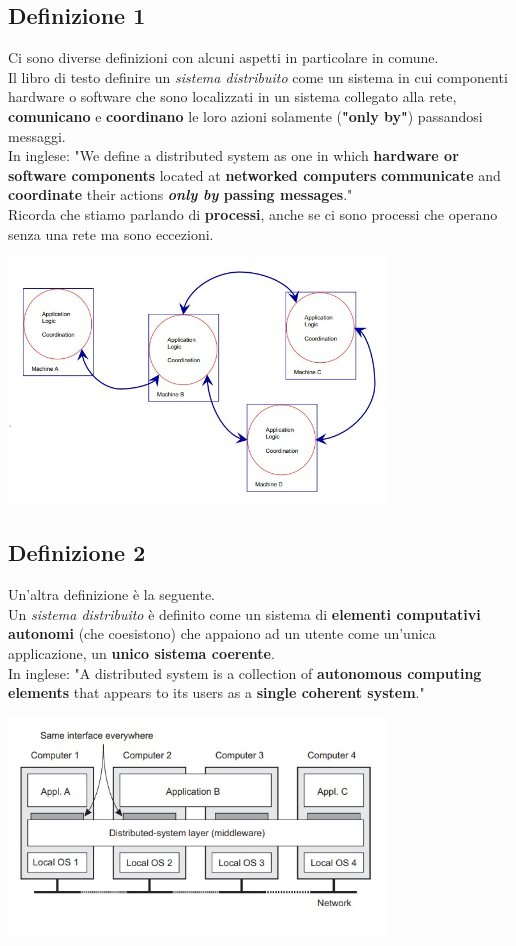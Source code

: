 \subsection{Definizione 1}
Ci sono diverse definizioni con alcuni aspetti in particolare in comune.
\\Il libro di testo definire un \textit{sistema distribuito} come un sistema in cui componenti hardware o software che sono localizzati in un sistema collegato alla rete, \textbf{comunicano} e \textbf{coordinano} le loro azioni solamente (\textbf{"only by"}) passandosi messaggi.
\\In inglese: "We define a distributed system as one in which \textbf{hardware or software components} located at \textbf{networked computers} \textbf{communicate} and \textbf{coordinate} their actions \textbf{\textit{only by} passing messages}."
\\Ricorda che stiamo parlando di \textbf{processi}, anche se ci sono processi che operano senza una rete ma sono eccezioni.
\begin{center}
    \includegraphics[width=0.75\textwidth]{img/lez28022023_def1.jpg}
\end{center}

\subsection{Definizione 2}
Un'altra definizione è la seguente.
\\Un \textit{sistema distribuito} è definito come un sistema di \textbf{elementi computativi autonomi} (che coesistono) che appaiono ad un utente come un'unica applicazione, un \textbf{unico sistema coerente}.
\\In inglese: "A distributed system is a collection of \textbf{autonomous computing elements} that appears to its users as a \textbf{single coherent system}."
\begin{center}
    \includegraphics[width=0.75\textwidth]{img/lez28022023_def2.jpg}
\end{center}

